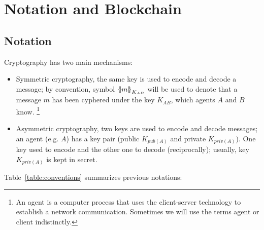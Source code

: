 \section{Notation and Blockchain}
\label{sec:TheoreticalFramework}

\subsection{Notation}

Cryptography has two main mechanisms:
\begin{itemize}
  \item Symmetric cryptography, the same key is used to encode and
    decode a message; by convention, symbol $\fat{m}_{K_{AB}}$ will be
    used to denote that a message $m$ has been cyphered under the key
    $K_{AB}$, which agents $A$ and $B$ know. \footnote{An agent is a 
        computer process that uses the client-server technology to 
        establish a network communication. Sometimes we will use the 
        terms agent or client indistinctly.} 
  \item Asymmetric cryptography, two keys are used to encode and
    decode messages; an agent (e.g. $A$) has a key pair
    (public $K_{pub(A)}$ and private $K_{priv(A)}$). One key used to
    encode and the other one to decode (reciprocally); usually, key
    $K_{priv(A)}$ is kept in secret. 
\end{itemize}
Table~\ref{table:conventions} summarizes previous notations:
